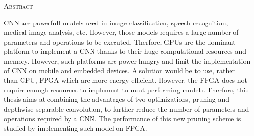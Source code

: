 \vspace*{\fill}
\begin{center}
    \huge{\textsc{Abstract}}
    \end{center}
    
    CNN are powerfull models used in image classification, speech recognition, medical image analysis, etc. However, those models requires a large number of parameters and operations to be executed. Therfore, GPUs are the dominant platform to implement a CNN thanks to their huge computational resources and memory. However, such platforms are power hungry and limit the implementation of CNN on mobile and embedded devices. A solution would be to use, rather than GPU, FPGA which are more energy efficient. However, the FPGA does not require enough resources to implement to most performing models. Therfore, this thesis aims at combining the advantages of two optimizations, pruning and depthwise separable convolution, to further reduce the number of parameters and operations required by a CNN. The performance of this new pruning scheme is studied by implementing such model on FPGA.
\vspace*{\fill}
\afterpage{\blankpage}
\newpage

